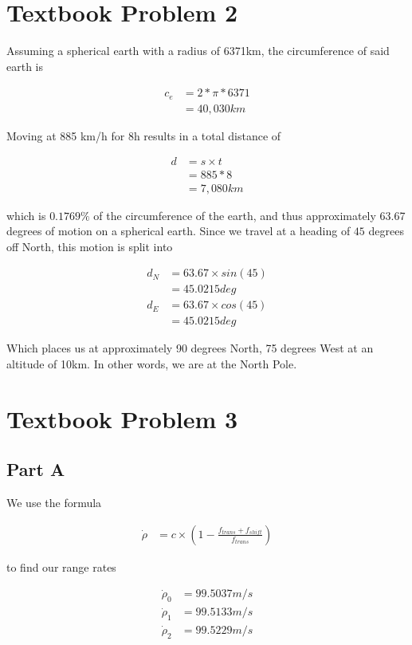 \documentclass[]{article}
\begin{document}
\section{Textbook Problem 2}

Assuming a spherical earth with a radius of 6371km, the circumference of said earth is 

\begin{align*}
	c_e &= 2 * \pi * 6371 \\
	&= 40,030km
\end{align*}

Moving at 885 km/h for 8h results in a total distance of 

\begin{align*}
	d &= s \times t \\
	&= 885 * 8 \\
	&= 7,080km
\end{align*}

which is $0.1769\%$ of the circumference of the earth, and thus approximately 63.67 degrees of motion on a spherical earth.
Since we travel at a heading of $45$ degrees off North, this motion is split into 

\begin{align*}
	d_N &= 63.67 \times sin(45) \\
	&= 45.0215 deg \\
	d_E &= 63.67 \times cos(45) \\
	&= 45.0215 deg
\end{align*}

Which places us at approximately 90 degrees North, 75 degrees West at an altitude of 10km.
In other words, we are at the North Pole.

\section{Textbook Problem 3}

\subsection{Part A}

We use the formula 

\begin{align*}
	\dot{\rho} &= c \times (1 - \frac{f_{trans} + f_{shift}}{f_{trans}})
\end{align*}

to find our range rates

\begin{align*}
	\dot{\rho}_0 &= 99.5037 m/s \\
	\dot{\rho}_1 &= 99.5133 m/s \\
	\dot{\rho}_2 &= 99.5229 m/s
\end{align*}
\end{document}
